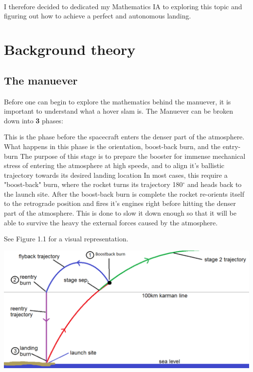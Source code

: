 \documentclass[12pt]{article}
\begin{document}
    \paragraph{\noindent}
        I therefore decided to dedicated my Mathematics IA to exploring this topic and figuring out how to achieve a perfect and autonomous landing.

    

    \section{Background theory}
        \subsection{The manuever}
        \paragraph{}
        Before one can begin to explore the mathematics behind the manuever, it is important to understand what a hover slam is.
        The Manuever can be broken down into \textbf{3} phases: 
            



    This is the phase before the spacecraft enters the denser part of the atmosphere. What happens in this phase is the orientation, boost-back burn, and the entry-burn
    The purpose of this stage is to prepare the booster for immense mechanical stress of entering the atmosphere at high speeds, and to align it's ballistic trajectory towards its desired landing location
    In most cases, this require a "boost-back" burn, where the rocket turns its trajectory 180{$^\circ $} and heads back to the launch site. 
    After the boost-back burn is complete the rocket re-orients itself to the retrograde position and fires it's engines right before hitting the denser part of the atmosphere. This is done to slow it down enough so that it will be able to survive the heavy the external forces caused by the atmosphere.
    
    \noindent See Figure 1.1 for a visual representation.
    
    \begin{center}

        \includegraphics[scale=0.5]{Trajectory-landing.png}
    \end{center}
\end{document}
